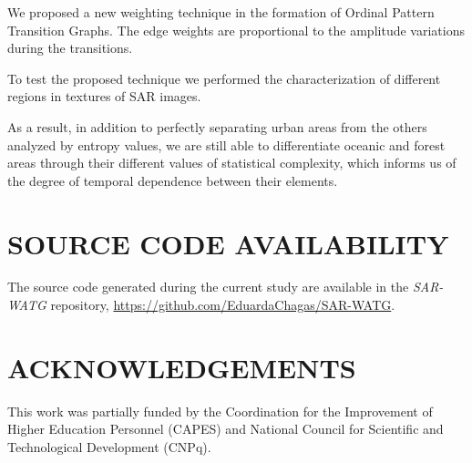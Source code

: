 \documentclass{isprs}
\begin{document}
We proposed a new weighting technique in the formation of Ordinal Pattern Transition Graphs.
The edge weights are proportional to the amplitude variations during the transitions.

To test the proposed technique we performed the characterization of different regions in textures of SAR images.

As a result, in addition to perfectly separating urban areas from the others analyzed by entropy values, we are still able to differentiate oceanic and forest areas through their different values of statistical complexity, which informs us of the degree of temporal dependence between their elements.

\section{SOURCE CODE AVAILABILITY}

The source code generated during the current study are available in the \textit{SAR-WATG} repository, \url{https://github.com/EduardaChagas/SAR-WATG}.



\section*{ACKNOWLEDGEMENTS}\label{ACKNOWLEDGEMENTS}

This work was partially funded by the Coordination for the Improvement of Higher Education Personnel (CAPES) and National Council for Scientific and Technological Development (CNPq).
\end{document}
